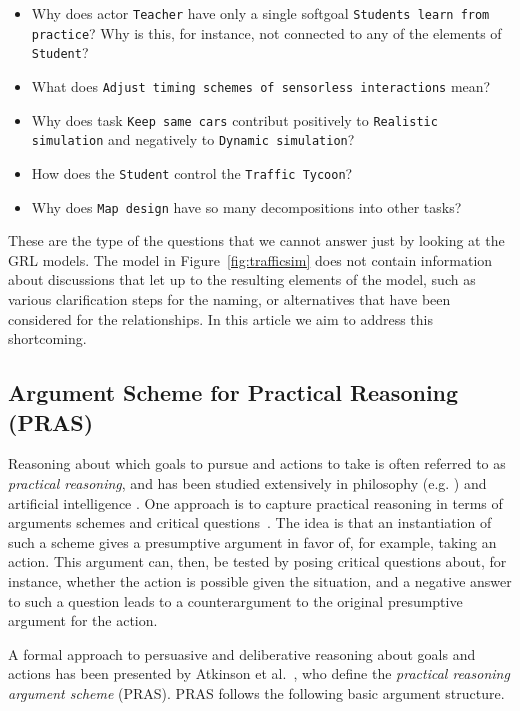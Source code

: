 \begin{itemize}
	\item Why does actor \texttt{Teacher} have only a single softgoal \texttt{Students learn from practice}? Why is this, for instance, not connected to any of the elements of \texttt{Student}?
	\item What does  \texttt{Adjust timing schemes of sensorless interactions} mean?
	\item Why does task \texttt{Keep same cars} contribut positively to \texttt{Realistic simulation} and negatively to \texttt{Dynamic simulation}?
	\item How does the \texttt{Student} control the \texttt{Traffic Tycoon}?
	\item Why does \texttt{Map design} have so many decompositions into other tasks?
\end{itemize}

These are the type of the questions that we cannot answer just by looking at the GRL models. The model in Figure~\ref{fig:trafficsim} does not contain information about discussions that let up to the resulting elements of the model, such as various clarification steps for the naming, or alternatives that have been considered for the relationships. In this article we aim to address this shortcoming.

\subsection{Argument Scheme for Practical Reasoning (PRAS)}
\label{sect:background:pras}

Reasoning about which goals to pursue and actions to take is often referred to as \emph{practical reasoning}, and has been studied extensively in philosophy (e.g. \cite{Raz1978-RAZPR,walton1990}) and artificial intelligence \cite{bratman1987,atkinson2007}. One approach is to capture practical reasoning in terms of arguments schemes and critical questions~\cite{walton1990}. The idea is that an instantiation of such a scheme gives a presumptive argument in favor of, for example, taking an action. This argument can, then, be tested by posing critical questions about, for instance, whether the action is possible given the situation, and a negative answer to such a question leads to a counterargument to the original presumptive argument for the action. 

A formal approach to persuasive and deliberative reasoning about goals and actions has been presented by Atkinson et al.~\cite{atkinson2007}, who define the \emph{practical reasoning argument scheme} (PRAS). PRAS follows the following basic argument structure. 

